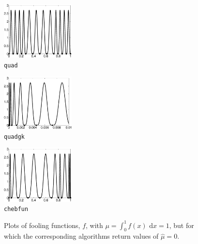 \documentclass[graybox]{svmult}
\newcommand{\rd}{\,\mathrm{d}}
\newcommand{\hmu}{\hat{\mu}}
\newcommand{\dif}{\rd}
\begin{document}
\begin{figure}
\centering
\begin{minipage}{3.7cm} \centering \includegraphics[width=3.7cm]{Foolquadbw.eps} \\ {\tt quad} \end{minipage}
\begin{minipage}{3.7cm} \centering \includegraphics[width=3.7cm]{Foolquadgkbw.eps} \\ {\tt quadgk} \end{minipage}
\begin{minipage}{3.7cm} \centering \includegraphics[width=3.7cm]{Foolchebintbw.eps} \\ {\tt chebfun} \end{minipage}
\caption{Plots of fooling functions, $f$, with $\mu=\int_0^1 f(x) \, \dif x=1$, but for which the corresponding algorithms return values of $\hmu=0$. \label{foolfunfig}}
\end{figure}
\end{document}
